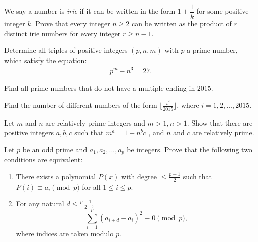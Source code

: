 \documentclass[problems.tex]{subfile}
\begin{document}
	
	
	\begin{problem}[CentroAmerican 2016]
		We say a number is \textit{irie} if it can be written in the form $1+\dfrac{1}{k}$ for some positive integer $k$. Prove that every integer $n \geq 2$ can be written as the product of $r$ distinct irie numbers for every integer $r \geq n-1$. %
	\end{problem}
	
	
	\begin{problem}[Chile 2016]
		Determine all triples of positive integers $(p, n, m)$ with $p$ a prime number, which satisfy the equation:
		\begin{align*}
			p^m - n^3 = 27.
		\end{align*}
	\end{problem}
	
	
	\begin{problem}
		Find all prime numbers that do not have a multiple ending in $2015$.
	\end{problem}
	
	\begin{problem}[Chile 2016]
		Find the number of different numbers of the form $\lfloor\frac{i^2}{2015}\rfloor$, where $i=1,2,\dots,2015$.
	\end{problem}
	
	
	\begin{problem}
		Let $m$ and $n$ are relatively prime integers and $m>1,n>1$. Show that there are positive integers $a,b,c$ such that $m^a=1+n^bc$ , and $n$ and $c$ are relatively prime. %
	\end{problem}
	
	
	
	\begin{problem}
		Let $p$ be an odd prime and $a_1, a_2,...,a_p$ be integers. Prove that the following two conditions are equivalent:
		\begin{enumerate}
			\item There exists a polynomial $P(x)$ with degree $\leq \frac{p-1}{2}$ such that $P(i) \equiv a_i \pmod p$ for all $1 \leq i \leq p$.
			\item For any natural $d \leq \frac{p-1}{2}$,
			$$ \sum_{i=1}^p (a_{i+d} - a_i )^2 \equiv 0 \pmod p,$$
			where indices are taken modulo $p$.
		\end{enumerate}
	\end{problem}
	
\end{document}
